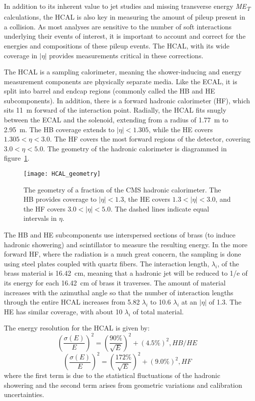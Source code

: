 In addition to its inherent value to jet studies and missing transverse energy
\emph{ME\textsubscript{T}} calculations, the HCAL is also key in measuring the
amount of pileup present in a collision. As most analyses are sensitive to the
number of soft interactions underlying their events of interest, it is important
to account and correct for the energies and compositions of these pileup events.
The HCAL, with its wide coverage in $|\eta|$ provides measurements critical in
these corrections.

The HCAL is a sampling calorimeter, meaning the shower-inducing and energy
measurement components are physically separate media. Like the ECAL, it is split
into barrel and endcap regions (commonly called the HB and HE subcomponents). In
addition, there is a forward hadronic calorimeter (HF), which sits 11~m forward
of the interaction point. Radially, the HCAL fits snugly between the ECAL and
the solenoid, extending from a radius of 1.77~m to 2.95~m. The HB coverage
extends to $|\eta| < 1.305$, while the HE covers $1.305 < \eta < 3.0$. The HF
covers the most forward regions of the detector, covering $3.0 < \eta < 5.0$.
The geometry of the hadronic calorimeter is diagrammed in
figure~\ref{fig:HCAL_geometry}.

\begin{figure}[h]
\centering
\texttt{[image: HCAL\_geometry]}
\caption[The geometry of the CMS hadronic calorimeter.]{The geometry of a
fraction of the CMS hadronic calorimeter. The HB provides coverage
to $|\eta|<1.3$, the HE covers $1.3<|\eta|<3.0$, and the HF covers
$3.0<|\eta|<5.0$. The dashed lines indicate equal intervals in $\eta$.}
\label{fig:HCAL_geometry}
\end{figure}

The HB and HE subcomponents use interspersed sections of brass (to induce
hadronic showering) and scintillator to measure the resulting energy. In the
more forward HF, where the radiation is a much great concern, the sampling is
done using steel plates coupled with quartz fibers. The interaction length,
$\lambda_i$, of the brass material is 16.42~cm, meaning that a hadronic jet will
be reduced to 1/e of its energy for each 16.42~cm of brass it traverses. The
amount of material increases with the azimuthal angle so that the number of
interaction lengths through the entire HCAL increases from 5.82 $\lambda_i$ to
10.6 $\lambda_i$ at an $|\eta|$ of 1.3. The HE has similar coverage, with about
10 $\lambda_i$ of total material.

The energy resolution for the HCAL is given by:
\begin{equation}
    \left(\frac{\sigma(E)}{E}\right)^2 =
    \left(\frac{90\%}{\sqrt{E}}\right)^2+(4.5\%)^2, HB/HE
\end{equation}
\begin{equation}
    \left(\frac{\sigma(E)}{E}\right)^2 =
    \left(\frac{172\%}{\sqrt{E}}\right)^2+(9.0\%)^2, HF
\end{equation}
where the first term is due to the statistical fluctuations of the hadronic
showering and the second term arises from geometric variations and calibration
uncertainties. 

